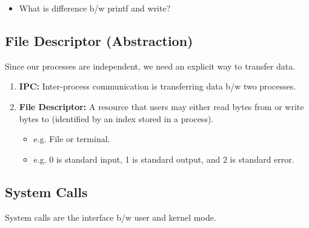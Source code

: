\begin{faq}
    \begin{itemize}
        \item What is difference b/w printf and write?
    \end{itemize}
\end{faq}
\subsection{File Descriptor (Abstraction)}
\begin{motivation}
    Since our processes are independent, we need an explicit way to transfer data.
\end{motivation}

\begin{definition}
    \begin{enumerate}
        \item \textbf{IPC:} Inter-process communication is transferring data b/w two processes.
        \item \textbf{File Descriptor:} A resource that users may either read bytes from or write bytes to (identified by an index stored in a process).
        \begin{itemize}
            \item e.g. File or terminal.
            \item e.g. 0 is standard input, 1 is standard output, and 2 is standard error.
        \end{itemize}
    \end{enumerate}
\end{definition}

\subsection{System Calls}
\begin{definition}
    System calls are the interface b/w user and kernel mode.
\end{definition}

